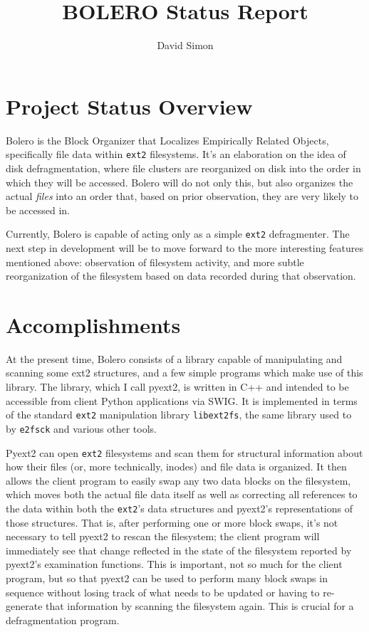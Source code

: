 \documentclass[10pt]{article}
\author{David Simon}
\title{BOLERO Status Report}
\begin{document}
\maketitle

\section{Project Status Overview}

Bolero is the Block Organizer that Localizes Empirically Related Objects, specifically file data within \texttt{ext2} filesystems. It's an elaboration on the idea of disk defragmentation, where file clusters are reorganized on disk into the order in which they will be accessed. Bolero will do not only this, but also organizes the actual \emph{files} into an order that, based on prior observation, they are very likely to be accessed in.

Currently, Bolero is capable of acting only as a simple \texttt{ext2} defragmenter. The next step in development will be to move forward to the more interesting features mentioned above: observation of filesystem activity, and more subtle reorganization of the filesystem based on data recorded during that observation.

\section{Accomplishments}

At the present time, Bolero consists of a library capable of manipulating and scanning some ext2 structures, and a few simple programs which make use of this library. The library, which I call pyext2, is written in C++ and intended to be accessible from client Python applications via SWIG. It is implemented in terms of the standard \texttt{ext2} manipulation library \texttt{libext2fs}, the same library used to by \texttt{e2fsck} and various other tools. 

Pyext2 can open \texttt{ext2} filesystems and scan them for structural information about how their files (or, more technically, inodes) and file data is organized. It then allows the client program to easily swap any two data blocks on the filesystem, which moves both the actual file data itself as well as correcting all references to the data within both the \texttt{ext2}'s data structures and pyext2's representations of those structures. That is, after performing one or more block swaps, it's not necessary to tell pyext2 to rescan the filesystem; the client program will immediately see that change reflected in the state of the filesystem reported by pyext2's examination functions. This is important, not so much for the client program, but so that pyext2 can be used to perform many block swaps in sequence without losing track of what needs to be updated or having to re-generate that information by scanning the filesystem again. This is crucial for a defragmentation program.
\end{document}
